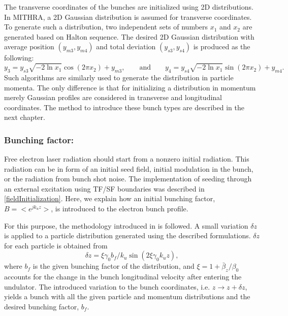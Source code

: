The transverse coordinates of the bunches are initialized using 2D distributions.
%
In MITHRA, a 2D Gaussian distribution is assumed for transverse coordinates.
%
To generate such a distribution, two independent sets of numbers $x_1$ and $x_2$ are generated based on Halton sequence.
%
The desired 2D Gaussian distribution with average position $(y_{m3},y_{m4})$ and total deviation $(y_{s3},y_{s4})$ is produced as the following: %
%
\begin{equation}
\label{gaussian2D}
\displaystyle y_3 = y_{s3} \sqrt{-2 \ln x_1} \cos(2\pi x_2) + y_{m3}, \qquad \mathrm{and} \qquad
\displaystyle y_4 = y_{s4} \sqrt{-2 \ln x_1} \sin(2\pi x_2) + y_{m4}.
\end{equation}
%
Such algorithms are similarly used to generate the distribution in particle momenta.
%
The only difference is that for initializing a distribution in momentum merely Gaussian profiles are considered in transverse and longitudinal coordinates.
%
The method to introduce these bunch types are described in the next chapter.

\subsubsection{Bunching factor:}

Free electron laser radiation should start from a nonzero initial radiation.
%
This radiation can be in form of an initial seed field, initial modulation in the bunch, or the radiation from bunch shot noise.
%
The implementation of seeding through an external excitation using TF/SF boundaries was described in \ref{fieldInitialization}.
%
Here, we explain how an initial bunching factor, $B = <e^{jk_uz}>$, is introduced to the electron bunch profile.

For this purpose, the methodology introduced in \cite{penman1992simulation} is followed. 
%
A small variation $\delta z$ is applied to a particle distribution generated using the described formulations.
%
$\delta z$ for each particle is obtained from
%
\begin{equation}
\label{bunchingFactor}
\delta z = \xi \gamma_0 b_f / k_u \sin (2 \xi \gamma_0 k_u z),
\end{equation}
%
where $b_f$ is the given bunching factor of the distribution, and $\xi=1+\bar{\beta}_z/\beta_0$ accounts for the change in the bunch longitudinal velocity after entering the undulator.
%
The introduced variation to the bunch coordinates, i.e. $z \rightarrow z+\delta z$, yields a bunch with all the given particle and momentum distributions and the desired bunching factor, $b_f$.

